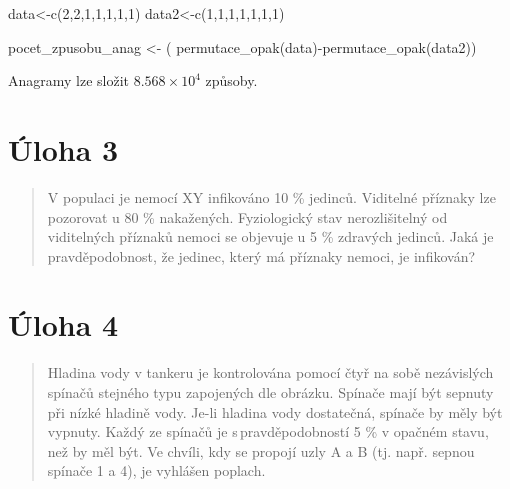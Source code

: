 \documentclass[
]{scrreprt}
\newenvironment{Shaded}{\begin{snugshade}}{\end{snugshade}}
\newcommand{\DecValTok}[1]{\textcolor[rgb]{0.00,0.00,0.81}{#1}}
\newcommand{\FunctionTok}[1]{\textcolor[rgb]{0.00,0.00,0.00}{#1}}
\newcommand{\NormalTok}[1]{#1}
\newcommand{\OtherTok}[1]{\textcolor[rgb]{0.56,0.35,0.01}{#1}}
\newcommand{\SpecialCharTok}[1]{\textcolor[rgb]{0.00,0.00,0.00}{#1}}
\begin{document}
\begin{Shaded}
\begin{Highlighting}[]
\NormalTok{data}\OtherTok{\textless{}{-}}\FunctionTok{c}\NormalTok{(}\DecValTok{2}\NormalTok{,}\DecValTok{2}\NormalTok{,}\DecValTok{1}\NormalTok{,}\DecValTok{1}\NormalTok{,}\DecValTok{1}\NormalTok{,}\DecValTok{1}\NormalTok{,}\DecValTok{1}\NormalTok{)}
\NormalTok{data2}\OtherTok{\textless{}{-}}\FunctionTok{c}\NormalTok{(}\DecValTok{1}\NormalTok{,}\DecValTok{1}\NormalTok{,}\DecValTok{1}\NormalTok{,}\DecValTok{1}\NormalTok{,}\DecValTok{1}\NormalTok{,}\DecValTok{1}\NormalTok{,}\DecValTok{1}\NormalTok{)}

\NormalTok{pocet\_zpusobu\_anag }\OtherTok{\textless{}{-}}\NormalTok{ (}
         \FunctionTok{permutace\_opak}\NormalTok{(data)}\SpecialCharTok{{-}}\FunctionTok{permutace\_opak}\NormalTok{(data2))}
\end{Highlighting}
\end{Shaded}

Anagramy lze složit \ensuremath{8.568\times 10^{4}} způsoby.

\hypertarget{uxfaloha-3}{%
\chapter{Úloha 3}\label{uxfaloha-3}}

\begin{quote}
V populaci je nemocí XY infikováno 10 \% jedinců. Viditelné příznaky lze
pozorovat u 80 \% nakažených. Fyziologický stav nerozlišitelný od
viditelných příznaků nemoci se objevuje u 5 \% zdravých jedinců. Jaká je
pravděpodobnost, že jedinec, který má příznaky nemoci, je infikován?
\end{quote}

\hypertarget{uxfaloha-4}{%
\chapter{Úloha 4}\label{uxfaloha-4}}

\begin{quote}
Hladina vody v tankeru je kontrolována pomocí čtyř na sobě nezávislých
spínačů stejného typu zapojených dle obrázku. Spínače mají být sepnuty
při nízké hladině vody. Je-li hladina vody dostatečná, spínače by měly
být vypnuty. Každý ze spínačů je s\,pravděpodobností 5 \% v opačném
stavu, než by měl být. Ve chvíli, kdy se propojí uzly A a B (tj. např.
sepnou spínače 1 a 4), je vyhlášen poplach.
\end{quote}
\end{document}
